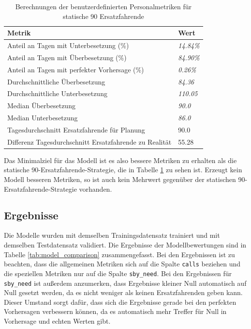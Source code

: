\documentclass[%
pdftex,
oneside,			%
11pt,				%
parskip=half,		%
headheight = 12pt,	%
headsepline,		%
footsepline,		%
footheight = 16pt,	%
abstracton,		%
DIV=calc,		%
BCOR=8mm,		%
headinclude=false,	%
footinclude=false,	%
listof=totoc,		%
toc=bibliography,	%
]{scrreprt}	%
\begin{document}
        \begin{table}[h!]
            \centering
            \begin{tabular}{|l|l|}
            \hline
            \textbf{Metrik} & \textbf{Wert} \\ \hline
            Anteil an Tagen mit Unterbesetzung (\%) & \textit{14.84\%} \\ \hline
            Anteil an Tagen mit Überbesetzung (\%) & \textit{84.90\%} \\ \hline
            Anteil an Tagen mit perfekter Vorhersage (\%) & \textit{0.26\%} \\ \hline
            Durchschnittliche Überbesetzung & \textit{84.36} \\ \hline
            Durchschnittliche Unterbesetzung & \textit{110.05} \\ \hline
            Median Überbesetzung & \textit{90.0} \\ \hline
            Median Unterbesetzung & \textit{86.0} \\ \hline
            Tagesdurchschnitt Ersatzfahrende für Planung & 90.0 \\ \hline
            Differenz Tagesdurchschnitt Ersatzfahrende zu Realität & 55.28 \\ \hline
            \end{tabular}
            \caption{Berechnungen der benutzerdefinierten Personalmetriken für statische 90 Ersatzfahrende}
            \label{tab:custom_metrics_90_sby}
        \end{table}

        Das Minimalziel für das Modell ist es also bessere Metriken zu erhalten als die statische 90-Ersatzfahrende-Strategie, die in Tabelle \ref{tab:custom_metrics_90_sby} zu sehen ist.
        Erzeugt kein Modell besseren Metriken, so ist auch kein Mehrwert gegenüber der statischen 90-Ersatzfahrende-Strategie vorhanden. 


        \subsection{Ergebnisse}

            Die Modelle wurden mit demselben Trainingsdatensatz trainiert und mit demselben Testdatensatz validiert.
            Die Ergebnisse der Modellbewertungen sind in Tabelle \ref{tab:model_comparison} zusammengefasst.
            Bei den Ergebnissen ist zu beachten, dass die allgemeinen Metriken sich auf die Spalte \texttt{calls} beziehen und die speziellen Metriken nur auf die Spalte \texttt{sby\_need}.
            Bei den Ergebnissen für \texttt{sby\_need} ist außerdem anzumerken, dass Ergebnisse kleiner Null automatisch auf Null gesetzt werden, da es nicht weniger als keinen Ersatzfahrenden geben kann.
            Dieser Umstand sorgt dafür, dass sich die Ergebnisse gerade bei den perfekten Vorhersagen verbessern können, da es automatisch mehr Treffer für Null in Vorhersage und echten Werten gibt.
\end{document}
